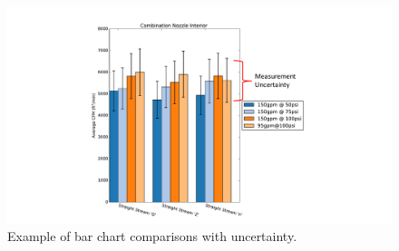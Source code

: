 \documentclass[12pt,oneside]{book}
\begin{document}
\begin{figure}[!ht]
\centering
\includegraphics[width=.8\columnwidth]{Figures/Air_Entrainment/Total_Entrainment_Example} 
\caption[Average Flow Rate Comparison]{Example of bar chart comparisons with uncertainty.}
\label{fig:cfmbarexplainer}
\end{figure}








\end{document}
